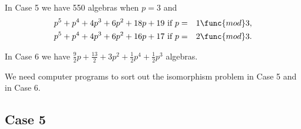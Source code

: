 \documentclass[10pt]{article}
\begin{document}
In Case 5 we have 550 algebras when $p=3$ and 
\begin{eqnarray*}
\allowbreak p^{5}+p^{4}+4p^{3}+6p^{2}+18p+19\text{ if }p &=&1\func{mod}3, \\
\allowbreak p^{5}+p^{4}+4p^{3}+6p^{2}+16p+17\text{ if }p &=&2\func{mod}3.
\end{eqnarray*}

In Case 6 we have $\frac{9}{2}p+\frac{13}{2}+3p^{2}+\frac{1}{2}p^{4}+\frac{1%
}{2}p^{3}$ algebras.

We need computer programs to sort out the isomorphism problem in Case 5 and
in Case 6.

\subsection{Case 5}
\end{document}
